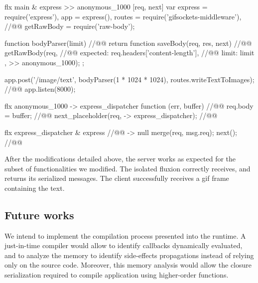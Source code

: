 \begin{code}[flx, caption={Simplified modification on the compiled result},label={lst:mflx-gifsocket}]
flx main & express
>> anonymous_1000 [req, next]
  var express = require('express'),
      app = express(),
      routes = require('gifsockets-middleware'), //@\label{lst:mflx-gifsocket:gif-mw}@
      getRawBody = require('raw-body');

  function bodyParser(limit) { //@\label{lst:mflx-gifsocket:bodyParser}@
    return function saveBody(req, res, next) { //@\label{lst:mflx-gifsocket:saveBody}@
      getRawBody(req, { //@\label{lst:mflx-gifsocket:getRawBody}@
        expected: req.headers['content-length'], //@\label{lst:mflx-gifsocket:req.headers}@
        limit: limit
      }, >> anonymous_1000);
    };
  }

  app.post('/image/text', bodyParser(1 * 1024 * 1024), routes.writeTextToImages); //@\label{lst:mflx-gifsocket:app.post}@
  app.listen(8000);

flx anonymous_1000
-> express_dispatcher
  function (err, buffer) { //@\label{lst:mflx-gifsocket:callback}@
    req.body = buffer; //@\label{lst:mflx-gifsocket:buffer}@
    next_placeholder(req, -> express_dispatcher); //@\label{lst:mflx-gifsocket:next-placeholder}@
  }

flx express_dispatcher & express //@\label{lst:mflx-gifsocket:express-dispatcher}@
-> null
  merge(req, msg.req);
  next(); //@\label{lst:mflx-gifsocket:next}@
\end{code}

After the modifications detailed above, the server works as expected for the subset of functionalities we modified.
The isolated fluxion correctly receives, and returns its serialized messages.
The client successfully receives a gif frame containing the text.

\subsection{Future works}

We intend to implement the compilation process presented into the runtime.
A just-in-time compiler would allow to identify callbacks dynamically evaluated, and to analyze the memory to identify side-effects propagations instead of relying only on the source code.
Moreover, this memory analysis would allow the closure serialization required to compile application using higher-order functions.


